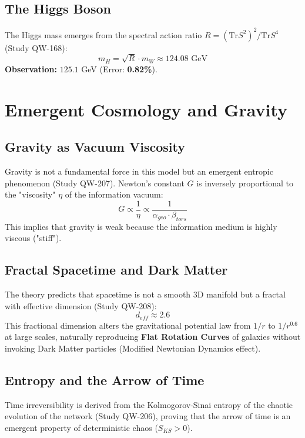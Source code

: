 \documentclass[11pt, a4paper]{article}
\begin{document}
\subsection{The Higgs Boson}
The Higgs mass emerges from the spectral action ratio $R = (\text{Tr} S^2)^2 / \text{Tr} S^4$ (Study QW-168):
\begin{equation}
m_H = \sqrt{R} \cdot m_W \approx 124.08 \text{ GeV}
\end{equation}
\textbf{Observation:} $125.1$ GeV (Error: \textbf{0.82\%}).

\section{Emergent Cosmology and Gravity}

\subsection{Gravity as Vacuum Viscosity}
Gravity is not a fundamental force in this model but an emergent entropic phenomenon (Study QW-207). Newton's constant $G$ is inversely proportional to the "viscosity" $\eta$ of the information vacuum:
\begin{equation}
G \propto \frac{1}{\eta} \propto \frac{1}{\alpha_{geo} \cdot \beta_{tors}}
\end{equation}
This implies that gravity is weak because the information medium is highly viscous ("stiff").

\subsection{Fractal Spacetime and Dark Matter}
The theory predicts that spacetime is not a smooth 3D manifold but a fractal with effective dimension (Study QW-208):
\begin{equation}
d_{eff} \approx 2.6
\end{equation}
This fractional dimension alters the gravitational potential law from $1/r$ to $1/r^{0.6}$ at large scales, naturally reproducing \textbf{Flat Rotation Curves} of galaxies without invoking Dark Matter particles (Modified Newtonian Dynamics effect).

\subsection{Entropy and the Arrow of Time}
Time irreversibility is derived from the Kolmogorov-Sinai entropy of the chaotic evolution of the network (Study QW-206), proving that the arrow of time is an emergent property of deterministic chaos ($S_{KS} > 0$).
\end{document}
